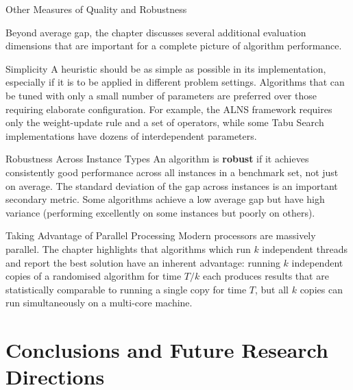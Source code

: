 \documentclass[aspectratio=169,10pt]{beamer}
\begin{document}
\begin{frame}[allowframebreaks]{Other Measures of Quality and Robustness}

  Beyond average gap, the chapter discusses several additional evaluation
  dimensions that are important for a complete picture of algorithm
  performance.

  \begin{block}{Simplicity}
    A heuristic should be as simple as possible in its implementation,
    especially if it is to be applied in different problem settings.
    Algorithms that can be tuned with only a small number of parameters
    are preferred over those requiring elaborate configuration.  For
    example, the ALNS framework requires only the weight-update rule
    and a set of operators, while some Tabu Search implementations
    have dozens of interdependent parameters.
  \end{block}

  \begin{block}{Robustness Across Instance Types}
    An algorithm is \textbf{robust} if it achieves consistently good
    performance across all instances in a benchmark set, not just on
    average.  The standard deviation of the gap across instances is
    an important secondary metric.  Some algorithms achieve a low
    average gap but have high variance (performing excellently on
    some instances but poorly on others).
  \end{block}

  \begin{block}{Taking Advantage of Parallel Processing}
    Modern processors are massively parallel.  The chapter highlights
    that algorithms which run $k$ independent threads and report the
    best solution have an inherent advantage: running $k$ independent
    copies of a randomised algorithm for time $T/k$ each produces
    results that are statistically comparable to running a single copy
    for time $T$, but all $k$ copies can run simultaneously on a
    multi-core machine.
  \end{block}

\end{frame}

\section{Conclusions and Future Research Directions}
\end{document}
